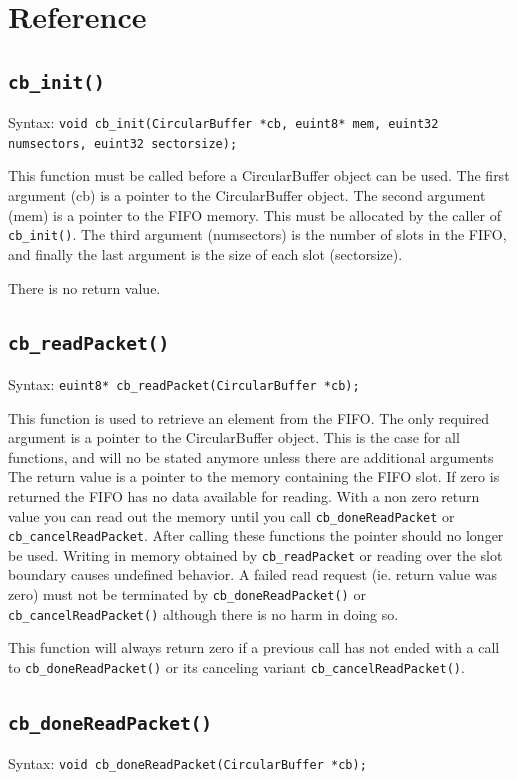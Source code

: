 \documentclass[a4paper]{article}
\begin{document}
\section{Reference}

\subsection*{\texttt{cb\_init()}}
Syntax: \lstinline!void cb_init(CircularBuffer *cb, euint8* mem, euint32 numsectors, euint32 sectorsize);!

This function must be called before a CircularBuffer object can be used. The first argument (cb) is a pointer to
the CircularBuffer object. The second argument (mem) is a pointer to the FIFO memory. This must be allocated by the caller of
\texttt{cb\_init()}. The third argument (numsectors) is the number of slots in the FIFO, and finally the last argument is the
size of each slot (sectorsize).

There is no return value.

\subsection*{\texttt{cb\_readPacket()}}
Syntax: \lstinline!euint8* cb_readPacket(CircularBuffer *cb);!

This function is used to retrieve an element from the FIFO. The only required argument is a pointer to the CircularBuffer object.
This is the case for all functions, and will no be stated anymore unless there are additional arguments
The return value is a pointer to the memory containing the FIFO slot. If zero is returned the FIFO has no data available for reading.
With a non zero return value you can read out the memory until you call \texttt{cb\_doneReadPacket} or \texttt{cb\_cancelReadPacket}.
After calling these functions the pointer should no longer be used. Writing in memory obtained by \texttt{cb\_readPacket} or reading over
the slot boundary causes undefined behavior. A failed read request (ie. return value was zero) must not
be terminated by \texttt{cb\_doneReadPacket()} or \texttt{cb\_cancelReadPacket()} although there is no harm in doing so.

This function will always return zero if a previous call has not ended with a call to \texttt{cb\_doneReadPacket()} or its canceling variant
\texttt{cb\_cancelReadPacket()}.

\subsection*{\texttt{cb\_doneReadPacket()}}
Syntax: \lstinline!void cb_doneReadPacket(CircularBuffer *cb);!
\end{document}

